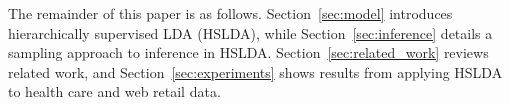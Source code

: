 The remainder of this paper is as follows. Section~\ref{sec:model}
introduces hierarchically supervised LDA (HSLDA), while
Section~\ref{sec:inference} details a sampling approach to inference in HSLDA. 
Section~\ref{sec:related_work} reviews related work, and
Section~\ref{sec:experiments} shows results from applying HSLDA to health care
and web retail data.  





%

